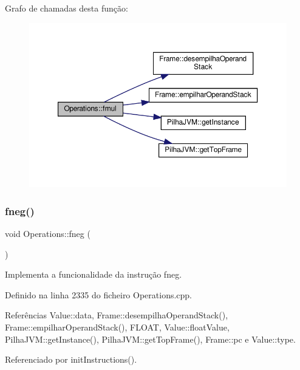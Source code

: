 Grafo de chamadas desta função\+:\nopagebreak
\begin{figure}[H]
\begin{center}
\leavevmode
\includegraphics[width=350pt]{classOperations_ad4caf68c912edd7bfac5c8d74c1e2036_cgraph}
\end{center}
\end{figure}
\mbox{\label{classOperations_a17a7d8f333373d30ae5b1595d96594e5}} 
\subsubsection{\texorpdfstring{fneg()}{fneg()}}
{\footnotesize\ttfamily void Operations\+::fneg (\begin{DoxyParamCaption}{ }\end{DoxyParamCaption})\hspace{0.3cm}{\ttfamily [private]}}



Implementa a funcionalidade da instrução fneg. 



Definido na linha 2335 do ficheiro Operations.\+cpp.



Referências Value\+::data, Frame\+::desempilha\+Operand\+Stack(), Frame\+::empilhar\+Operand\+Stack(), F\+L\+O\+AT, Value\+::float\+Value, Pilha\+J\+V\+M\+::get\+Instance(), Pilha\+J\+V\+M\+::get\+Top\+Frame(), Frame\+::pc e Value\+::type.



Referenciado por init\+Instructions().

